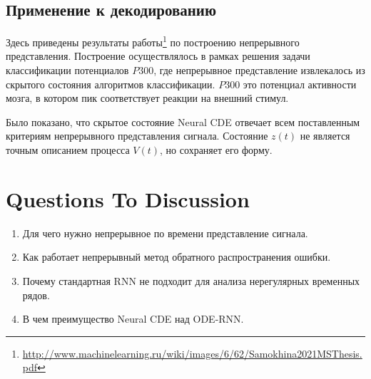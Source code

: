 \subsection{Применение к декодированию}

Здесь приведены результаты работы\footnote{\url{http://www.machinelearning.ru/wiki/images/6/62/Samokhina2021MSThesis.pdf}} по построению непрерывного представления. Построение осуществлялось в рамках решения задачи классификации потенциалов $P300$, где непрерывное представление извлекалось из скрытого состояния алгоритмов классификации. $P300$ это потенциал активности мозга, в котором пик соответствует реакции на внешний стимул. 

Было показано, что скрытое состояние Neural CDE отвечает всем поставленным критериям непрерывного представления сигнала. Состояние $z(t)$ не является точным описанием процесса $V(t)$, но сохраняет его форму.
	
\begin{figure}[ht]%
    \centering
    \qquad
\end{figure}

\section{Questions To Discussion}
\begin{enumerate}
    \item Для чего нужно непрерывное по времени представление сигнала.
    \item Как работает непрерывный метод обратного распространения ошибки.
    \item Почему стандартная RNN не подходит для анализа нерегулярных временных рядов.
    \item В чем преимущество Neural CDE над ODE-RNN.
\end{enumerate}